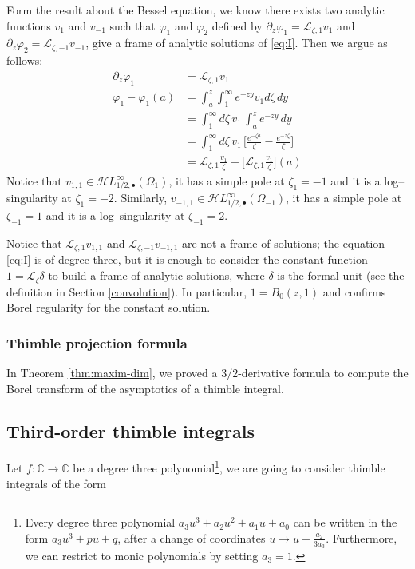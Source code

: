 \documentclass{article}
\newcommand{\singexp}[2]{\mathcal{H}L^\infty_{#1, #2}}
\newcommand{\singexpalg}[1]{\singexp{#1}{\bullet}}
\theoremstyle{definition}
\newcommand{\C}{\mathbb{C}}
\newcommand{\laplace}{\mathcal{L}}
\theoremstyle{plain}
\newenvironment{verify}{\color{ForestGreen}}{\color{black}}
\begin{document}
\begin{verify}
Form the result about the Bessel equation, we know there exists two analytic functions $v_1$ and $v_{-1}$ such that $\varphi_1$ and $\varphi_2$ defined by $\partial_z\varphi_1=\laplace_{\zeta,1}v_1$ and $\partial_z\varphi_2=\laplace_{\zeta,-1}v_{-1}$, give a frame of analytic solutions of \eqref{eq:I}. Then we argue as follows:
\begin{align*}
    \partial_z\varphi_1&=\laplace_{\zeta,1}v_1\\
    \varphi_1-\varphi_1(a)&=\int_a^z\int_1^{\infty}e^{-zy} v_1 d\zeta \, dy\\
    &=\int_1^{\infty}d\zeta\,  v_1 \, \int_a^ze^{-zy}  \, dy\\
    &=\int_1^{\infty}d\zeta\,  v_1 \, \Big[\frac{e^{-\zeta a}}{\zeta}-\frac{e^{-z\zeta}}{\zeta}\Big]\\
    &=\laplace_{\zeta,1} \tfrac{v_1}{\zeta}-\Big[\laplace_{\zeta,1}\tfrac{v_1}{\zeta}\Big](a)
\end{align*}
\end{verify}
Notice that $v_{1,1}\in\singexpalg{1/2}(\Omega_1)$, it has a simple pole at $\zeta_1=-1$ and it is a log--singularity at $\zeta_1=-2$. Similarly, $v_{-1,1}\in\singexpalg{1/2}(\Omega_{-1})$, it has a simple pole at $\zeta_{-1}=1$ and it is a log--singularity at $\zeta_{-1}=2$.

Notice that $\laplace_{\zeta,1}v_{1,1}$ and $\laplace_{\zeta,-1}v_{-1,1}$ are not a frame of solutions; the equation \eqref{eq:I} is of degree three, but it is enough to consider the constant function $1=\laplace_\zeta \delta$ to build a frame of analytic solutions, where $\delta$ is the formal unit (see the definition in Section \ref{convolution}). In particular, $1=B_0(z,1)$ and confirms Borel regularity for the constant solution. 
%
\color{RoyalBlue}
\subsubsection{Thimble projection formula}
In Theorem \ref{thm:maxim-dim}, we proved a $3/2$-derivative formula to compute the Borel transform of the asymptotics of a thimble integral.
\color{black}
\subsection{Third-order thimble integrals}
Let $f\colon\C\to \C$ be a degree three polynomial\footnote{Every degree three polynomial $a_3 u^3+a_2 u^2+a_1 u+a_0$ can be written in the form $a_3u^3+pu+q$, after a change of coordinates $u\to u-\frac{a_2}{3 a_3}$. Furthermore, we can restrict to monic polynomials by setting $a_3=1$.}, we are going to consider thimble integrals of the form 
\end{document}
